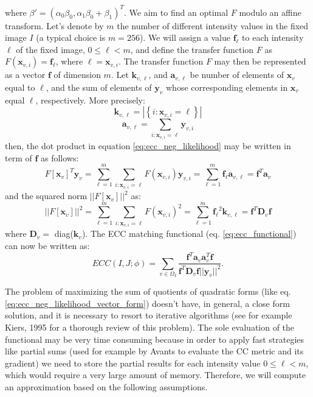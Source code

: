 where $\beta' = (\alpha_{0}\beta_{0}, \alpha_{1}\beta_{0} + \beta_{1})^{T}$. We aim to find an optimal $F$ modulo an affine transform. Let's denote by $m$ the number of different intensity values in the fixed image $I$ (a typical choice is $m=256$). We will assign a value $\mathbf{f}_{\ell}$ to each intensity $\ell$ of the fixed image, $0\leq \ell < m$, and define the transfer function $F$ as $F(\mathbf{x}_{v,i}) = \mathbf{f}_{\ell}$, where $\ell = \mathbf{x}_{v,i}$. The transfer function $F$ may then be represented as a vector $\mathbf{f}$ of dimension $m$. Let $\mathbf{k}_{v,\ell}$, and $\mathbf{a}_{v,\ell}$ be number of elements of $\mathbf{x}_{v}$ equal to $\ell$, and the sum of elements of $\mathbf{y}_{v}$ whose corresponding elements in $\mathbf{x}_{v}$ equal $\ell$, respectively. More precisely:
\begin{displaymath}
    \mathbf{k}_{v,\ell} = |\left\lbrace i : \mathbf{x}_{v,i}=\ell \right\rbrace|
\end{displaymath}
\begin{displaymath}
    \mathbf{a}_{v, \ell} = \sum_{i:\mathbf{x}_{v,i}=\ell} \mathbf{y}_{v,i}
\end{displaymath}
then, the dot product in equation \eqref{eq:ecc_neg_likelihood} may be written in term of $\mathbf{f}$ as follows:
\begin{displaymath}
    F\left[\mathbf{x}_{v}\right]^{T} \mathbf{y}_{v} = \sum_{\ell=1}^{m} \sum_{i:\mathbf{x}_{v,i}=\ell} F(\mathbf{x}_{v,i})\mathbf{y}_{v,i}
    =\sum_{\ell=1}^{m} \mathbf{f_{\ell}}\mathbf{a}_{v, \ell} = \mathbf{f}^{T}\mathbf{a}_{v}
\end{displaymath}
and the squared norm $||F[\mathbf{x}_{v}]||^{2}$ as:
\begin{displaymath}
    ||F\left[\mathbf{x}_{v}\right]||^{2} = \sum_{\ell=1}^{m} \sum_{i:\mathbf{x}_{v,i}=\ell} F(\mathbf{x}_{v,i})^{2}
    = \sum_{\ell=1}^{m} \mathbf{f_{\ell}}^{2} \mathbf{k}_{v, \ell} = \mathbf{f}^{T} \mathbf{D}_{v} \mathbf{f}
\end{displaymath}
where $\mathbf{D}_{v} = $ diag($\mathbf{k}_{v}$). The ECC matching functional (eq. \eqref{eq:ecc_functional}) can now be written as:
\begin{equation}\label{eq:ecc_neg_likelihood_vector_form}
    ECC(I, J;\phi) = \sum_{v\in\Omega_{I}}\frac{\mathbf{f}^{T}\mathbf{a}_{v}\mathbf{a}_{v}^{T}\mathbf{f}}
    {\mathbf{f}^{T} \mathbf{D}_{v} \mathbf{f}||\mathbf{y}_{v}||^{2}}.
\end{equation}

The problem of maximizing the sum of quotients of quadratic forms (like eq. \eqref{eq:ecc_neg_likelihood_vector_form}) doesn't have, in general, a close form solution, and it is necessary to resort to iterative algorithms (see for example Kiers, 1995 \cite{Kiers1995} for a thorough review of this problem). The sole evaluation of the functional may be very time consuming because in order to apply fast strategies like partial sums (used for example by Avants \cite{Avants2008} to evaluate the CC metric and its gradient) we need to store the partial results for each intensity value $0 \leq \ell < m$, which would require a very large amount of memory. Therefore, we will compute an approximation based on the following assumptions.\\

